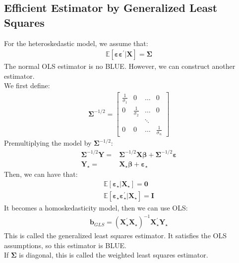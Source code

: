 \documentclass{article}
\begin{document}
\subsection{Efficient Estimator by Generalized Least Squares}
For the heteroskedastic model, we assume that:
	\begin{align*}
		\mathbb{E}[\boldsymbol{\varepsilon} \boldsymbol{\varepsilon}^\prime | \boldsymbol{X}] = \boldsymbol{\Sigma}
	\end{align*}
The normal OLS estimator is no BLUE. However, we can construct another estimator.\\
We first define:
	\begin{align*}
		\boldsymbol{\Sigma}^{-1/2} = 
		\begin{bmatrix}
			\frac{1}{\sigma_1} & 0 & \ldots & 0\\
			0 & \frac{1}{\sigma_2} & \ldots & 0\\
			& & \ddots &\\
			0 & 0 & \ldots & \frac{1}{\sigma_n}
		\end{bmatrix}
	\end{align*}
Premultiplying the model by $\boldsymbol{\Sigma}^{-1/2}$:
	\begin{align*}
		\boldsymbol{\Sigma}^{-1/2} \boldsymbol{Y} = &\boldsymbol{\Sigma}^{-1/2} \boldsymbol{X} \boldsymbol{\beta} + \boldsymbol{\Sigma}^{-1/2} \boldsymbol{\varepsilon}\\
		\boldsymbol{Y}_\star = &\boldsymbol{X}_\star \boldsymbol{\beta} + \boldsymbol{\varepsilon}_\star
	\end{align*}
Then, we can have that:
	\begin{align*}
		\mathbb{E} [\boldsymbol{\varepsilon}_\star | \boldsymbol{X}_\star] = \boldsymbol{0}\\
		\mathbb{E} [\boldsymbol{\varepsilon}_\star \boldsymbol{\varepsilon}^\prime_\star | \boldsymbol{X}_\star] = \boldsymbol{I}
	\end{align*}
It becomes a homoskedasticity model, then we can use OLS:
	\begin{align*}
		\boldsymbol{b}_{GLS} = (\boldsymbol{X}_\star^\prime \boldsymbol{X}_\star)^{-1} \boldsymbol{X}_\star^\prime \boldsymbol{Y}_\star
	\end{align*}
This is called the generalized least squares estimator. It satisfies the OLS assumptions, so this estimator is BLUE.\\
If $\boldsymbol{\Sigma}$ is diagonal, this is called the weighted least squares estimator.
\end{document}
